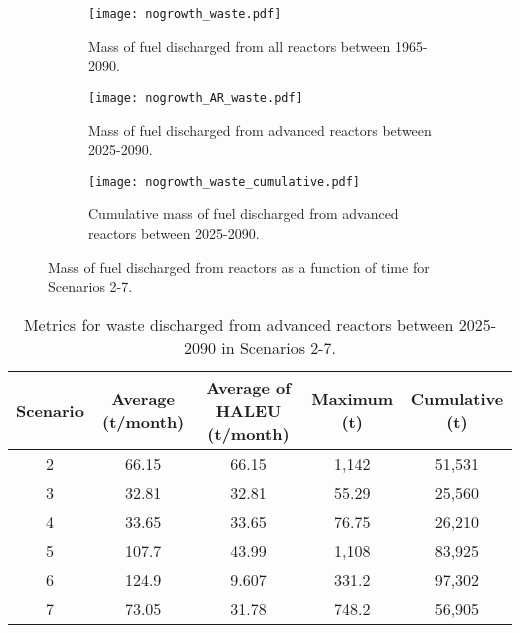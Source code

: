\begin{figure}
    \centering
    \begin{subfigure}[b]{0.45\textwidth}
        \centering
        \texttt{[image: nogrowth\_waste.pdf]}
        \caption{Mass of fuel discharged from all reactors 
        between 1965-2090.}
        \label{fig:nogrowth_all_waste}
    \end{subfigure}
    \hfill
    \begin{subfigure}[b]{0.45\textwidth}
        \centering
        \texttt{[image: nogrowth\_AR\_waste.pdf]}
        \caption{Mass of fuel discharged from advanced reactors 
        between 2025-2090.}
        \label{fig:nogrowth_AR_waste}
    \end{subfigure}
    \begin{subfigure}[b]{0.45\textwidth}
        \centering
        \texttt{[image: nogrowth\_waste\_cumulative.pdf]}
        \caption{Cumulative mass of fuel discharged from advanced reactors 
        between 2025-2090.}
        \label{fig:nogrowth_waste_cumulative}
    \end{subfigure}
       \caption{Mass of fuel discharged from reactors 
       as a function of time for Scenarios 2-7. }
       \label{fig:nogrowth_waste}
\end{figure}

\begin{table}
    \centering 
    \caption{Metrics for waste discharged from advanced reactors 
    between 2025-2090 in Scenarios 2-7.}
    \label{tab:nogrowth_waste}
    \begin{tabular}{c c c c c}
        \hline
        Scenario & Average (t/month) & Average of \gls{HALEU} 
        (t/month) & Maximum (t) & Cumulative (t)\\\hline
        2 & 66.15 & 66.15 & 1,142 & 51,531\\
        3 & 32.81 & 32.81 & 55.29 & 25,560\\
        4 & 33.65 & 33.65 & 76.75 & 26,210\\
        5 & 107.7 & 43.99 & 1,108 & 83,925\\
        6 & 124.9 & 9.607 & 331.2 & 97,302\\
        7 & 73.05 & 31.78 & 748.2 & 56,905\\
        \hline
    \end{tabular}
\end{table}

